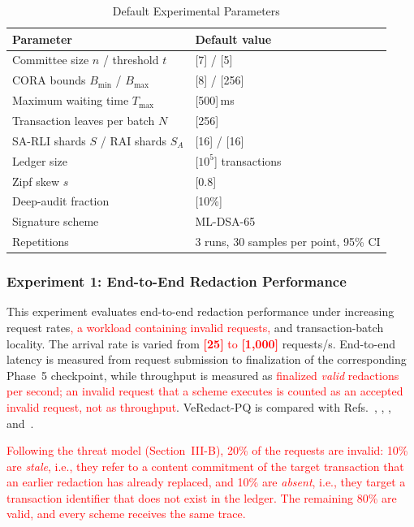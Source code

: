\documentclass[lettersize,journal]{IEEEtran}
\begin{document}
\begin{table}[t]
\centering
\caption{Default Experimental Parameters}
\label{tab:params}
\scriptsize
\renewcommand{\arraystretch}{1.08}
\setlength{\tabcolsep}{4pt}
\begin{tabular}{ll}
\hline
\textbf{Parameter} & \textbf{Default value} \\
\hline
Committee size $n$ / threshold $t$ & [7] / [5] \\
CORA bounds $B_{\min}$ / $B_{\max}$ & [8] / [256] \\
Maximum waiting time $T_{\max}$ & [500]\,ms \\
Transaction leaves per batch $N$ & [256] \\
SA-RLI shards $S$ / RAI shards $S_A$ & [16] / [16] \\
Ledger size & [$10^5$] transactions \\
Zipf skew $s$ & [0.8] \\
Deep-audit fraction & [10\%] \\
Signature scheme & ML-DSA-65 \\
Repetitions & 3 runs, 30 samples per point, 95\% CI \\
\hline
\end{tabular}
\end{table}

    
\subsubsection*{\textbf{Experiment 1: End-to-End Redaction Performance}}

This experiment evaluates end-to-end redaction performance under
increasing request rates\textcolor{red}{, a workload containing invalid
requests,} and transaction-batch locality. The arrival
rate is varied from \textcolor{red}{\textbf{[25]} to \textbf{[1,000]}}
requests/s.
End-to-end latency is measured from request submission to finalization
of the corresponding Phase~5 checkpoint, while throughput is measured
as \textcolor{red}{finalized \emph{valid} redactions per second; an
invalid request that a scheme executes is counted as an accepted invalid
request, not as throughput}. VeRedact-PQ is compared with
Refs.~\cite{ref1}, \cite{ref13}, \cite{ref27}, and~\cite{ref34}.

\textcolor{red}{Following the threat model (Section~III-B), 20\% of the
requests are invalid: 10\% are \emph{stale}, i.e., they refer to a content
commitment of the target transaction that an earlier redaction has
already replaced, and 10\% are \emph{absent}, i.e., they target a
transaction identifier that does not exist in the ledger. The remaining
80\% are valid, and every scheme receives the same trace.}
\end{document}
